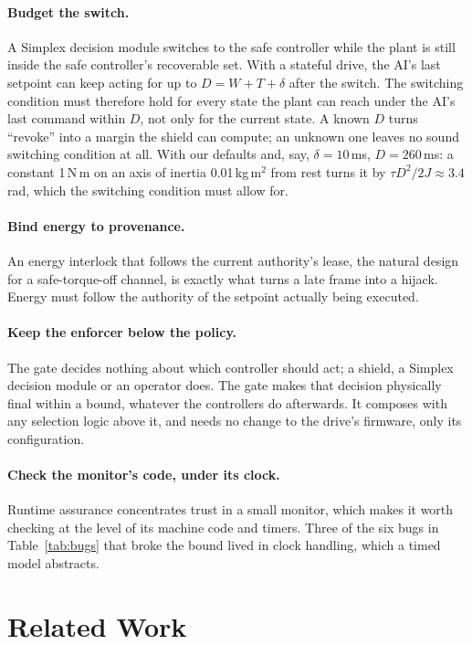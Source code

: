 \documentclass[letterpaper]{article} %
\begin{document}
\paragraph{Budget the switch.} A Simplex decision module switches to the safe controller while the
plant is still inside the safe controller's recoverable set. With a stateful drive, the AI's last
setpoint can keep acting for up to $D = W + T + \delta$ after the switch. The switching condition
must therefore hold for every state the plant can reach under the AI's last command within $D$,
not only for the current state. A known $D$ turns ``revoke'' into a margin the shield can
compute; an unknown one leaves no sound switching condition at all. With our defaults and, say,
$\delta = 10$\,ms, $D = 260$\,ms: a constant 1\,N\,m on an axis of inertia 0.01\,kg\,m$^2$
from rest turns it by $\tau D^2/2J \approx 3.4$\,rad, which the switching condition must allow for.

\paragraph{Bind energy to provenance.} An energy interlock that follows the current authority's
lease, the natural design for a safe-torque-off channel, is exactly what turns a late frame into
a hijack. Energy must follow the authority of the setpoint actually being executed.

\paragraph{Keep the enforcer below the policy.} The gate decides nothing about which controller
should act; a shield, a Simplex decision module or an operator does. The gate makes that decision
physically final within a bound, whatever the controllers do afterwards. It composes with any
selection logic above it, and needs no change to the drive's firmware, only its configuration.

\paragraph{Check the monitor's code, under its clock.} Runtime assurance concentrates trust in a
small monitor, which makes it worth checking at the level of its machine code and timers. Three of
the six bugs in Table~\ref{tab:bugs} that broke the bound lived in clock handling, which a
timed model abstracts.

\section{Related Work}
\label{sec:related}
\end{document}
